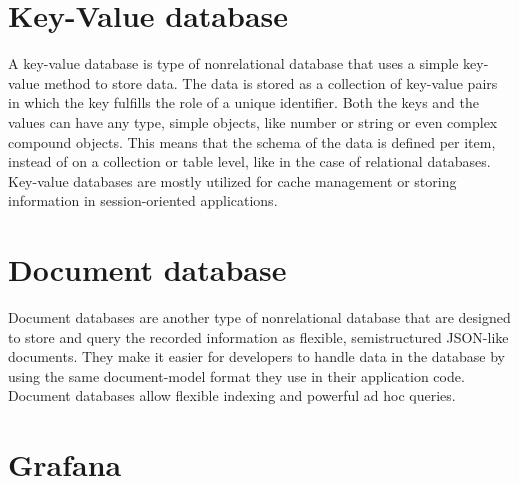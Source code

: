 \section{Key-Value database}


A key-value database is type of nonrelational database that uses a simple key-value method to store data. The data is stored as a collection of key-value pairs in which the key fulfills the role of a unique identifier. Both the keys and the values can have any type, simple objects, like number or string or even complex compound objects. This means that the schema of the data is defined per item, instead of on a collection or table level, like in the case of relational databases. Key-value databases are mostly utilized for cache management or storing information in session-oriented applications. \cite{keyvalue-database-aws}

\section{Document database}


Document databases are another type of nonrelational database that are designed to store and query the recorded information as flexible, semistructured JSON-like documents. They make it easier for developers to handle data in the database by using the same document-model format they use in their application code. Document databases allow flexible indexing and powerful ad hoc queries. \cite{document-database-aws}



\section{Grafana}

